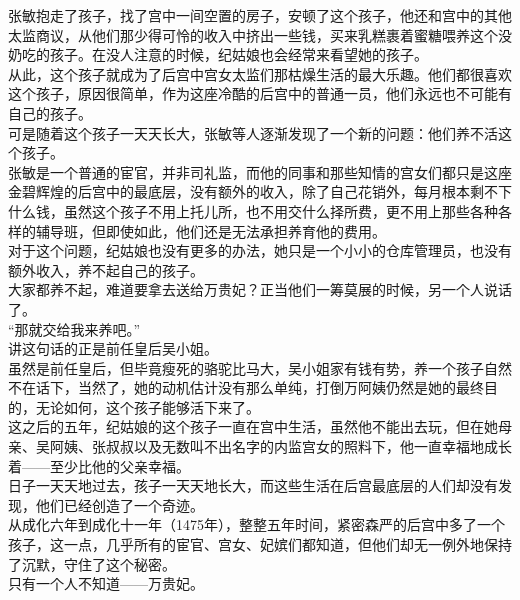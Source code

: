 \begin{multicols}{\theparacolNo}
张敏抱走了孩子，找了宫中一间空置的房子，安顿了这个孩子，他还和宫中的其他太监商议，从他们那少得可怜的收入中挤出一些钱，买来乳糕裹着蜜糖喂养这个没奶吃的孩子。在没人注意的时候，纪姑娘也会经常来看望她的孩子。\\

从此，这个孩子就成为了后宫中宫女太监们那枯燥生活的最大乐趣。他们都很喜欢这个孩子，原因很简单，作为这座冷酷的后宫中的普通一员，他们永远也不可能有自己的孩子。\\

可是随着这个孩子一天天长大，张敏等人逐渐发现了一个新的问题：他们养不活这个孩子。\\

张敏是一个普通的宦官，并非司礼监，而他的同事和那些知情的宫女们都只是这座金碧辉煌的后宫中的最底层，没有额外的收入，除了自己花销外，每月根本剩不下什么钱，虽然这个孩子不用上托儿所，也不用交什么择所费，更不用上那些各种各样的辅导班，但即使如此，他们还是无法承担养育他的费用。\\

对于这个问题，纪姑娘也没有更多的办法，她只是一个小小的仓库管理员，也没有额外收入，养不起自己的孩子。\\

大家都养不起，难道要拿去送给万贵妃？正当他们一筹莫展的时候，另一个人说话了。\\

“那就交给我来养吧。”\\

讲这句话的正是前任皇后吴小姐。\\

虽然是前任皇后，但毕竟瘦死的骆驼比马大，吴小姐家有钱有势，养一个孩子自然不在话下，当然了，她的动机估计没有那么单纯，打倒万阿姨仍然是她的最终目的，无论如何，这个孩子能够活下来了。\\

这之后的五年，纪姑娘的这个孩子一直在宫中生活，虽然他不能出去玩，但在她母亲、吴阿姨、张叔叔以及无数叫不出名字的内监宫女的照料下，他一直幸福地成长着——至少比他的父亲幸福。\\

日子一天天地过去，孩子一天天地长大，而这些生活在后宫最底层的人们却没有发现，他们已经创造了一个奇迹。\\

从成化六年到成化十一年（1475年），整整五年时间，紧密森严的后宫中多了一个孩子，这一点，几乎所有的宦官、宫女、妃嫔们都知道，但他们却无一例外地保持了沉默，守住了这个秘密。\\

只有一个人不知道——万贵妃。\\


\end{multicols}
